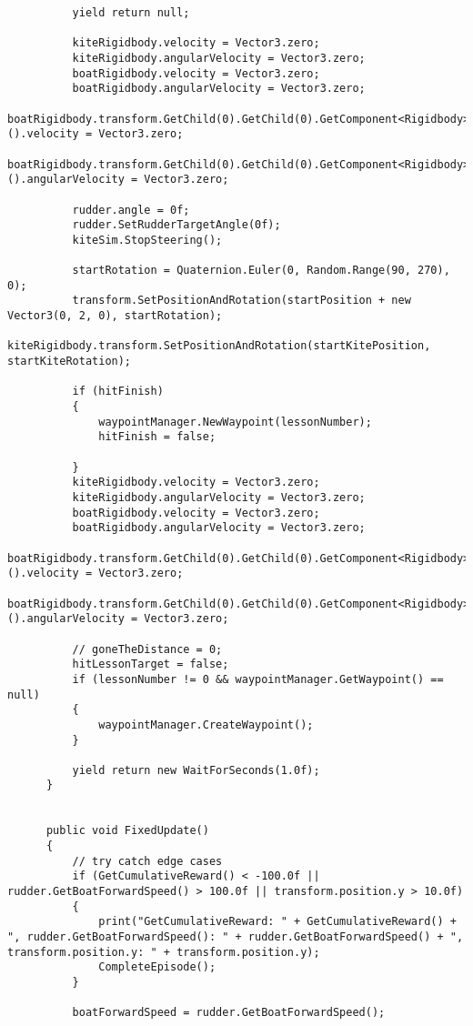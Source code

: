 \begin{lstlisting}
          yield return null;
          
          kiteRigidbody.velocity = Vector3.zero;
          kiteRigidbody.angularVelocity = Vector3.zero;
          boatRigidbody.velocity = Vector3.zero;
          boatRigidbody.angularVelocity = Vector3.zero;
          boatRigidbody.transform.GetChild(0).GetChild(0).GetComponent<Rigidbody>().velocity = Vector3.zero;
          boatRigidbody.transform.GetChild(0).GetChild(0).GetComponent<Rigidbody>().angularVelocity = Vector3.zero;
          
          rudder.angle = 0f;
          rudder.SetRudderTargetAngle(0f);
          kiteSim.StopSteering();
  
          startRotation = Quaternion.Euler(0, Random.Range(90, 270), 0);
          transform.SetPositionAndRotation(startPosition + new Vector3(0, 2, 0), startRotation);
          kiteRigidbody.transform.SetPositionAndRotation(startKitePosition, startKiteRotation);
  
          if (hitFinish)
          {
              waypointManager.NewWaypoint(lessonNumber);
              hitFinish = false;
              
          }
          kiteRigidbody.velocity = Vector3.zero;
          kiteRigidbody.angularVelocity = Vector3.zero;
          boatRigidbody.velocity = Vector3.zero;
          boatRigidbody.angularVelocity = Vector3.zero;
          boatRigidbody.transform.GetChild(0).GetChild(0).GetComponent<Rigidbody>().velocity = Vector3.zero;
          boatRigidbody.transform.GetChild(0).GetChild(0).GetComponent<Rigidbody>().angularVelocity = Vector3.zero;
  
          // goneTheDistance = 0;
          hitLessonTarget = false;
          if (lessonNumber != 0 && waypointManager.GetWaypoint() == null)
          {
              waypointManager.CreateWaypoint();
          }
  
          yield return new WaitForSeconds(1.0f);
      }
      
  
      public void FixedUpdate()
      {
          // try catch edge cases
          if (GetCumulativeReward() < -100.0f || rudder.GetBoatForwardSpeed() > 100.0f || transform.position.y > 10.0f)
          {
              print("GetCumulativeReward: " + GetCumulativeReward() + ", rudder.GetBoatForwardSpeed(): " + rudder.GetBoatForwardSpeed() + ", transform.position.y: " + transform.position.y);
              CompleteEpisode();
          }
  
          boatForwardSpeed = rudder.GetBoatForwardSpeed();
  

\end{lstlisting}
